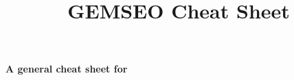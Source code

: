 \documentclass{article}
\title{GEMSEO Cheat Sheet}
\begin{document}
\begin{center}{\color{gemsbluetext}\Huge{\textbf{A general cheat sheet for~}}}\\
\end{center}
\begin{multicols*}{3}












\end{multicols*}
\end{document}
